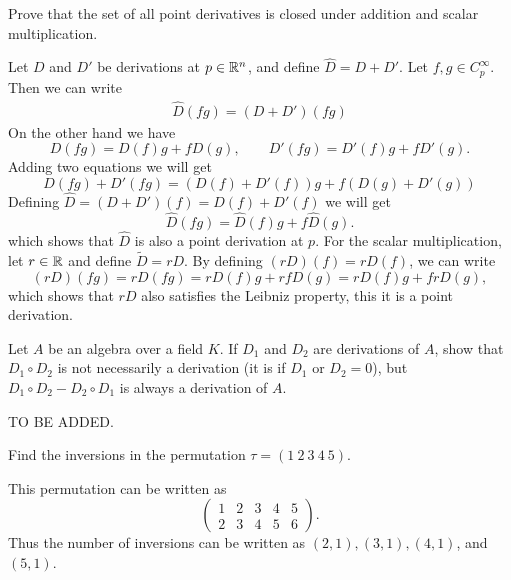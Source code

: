 \begin{problem}
	Prove that the set of all point derivatives is closed under addition and scalar multiplication.
\end{problem}
\begin{solution}
	Let $ D $ and $ D' $ be derivations at $ p\in\mathbb{R}^n $, and define $ \hat{D} = D + D' $. Let $ f,g \in C_p^\infty $. Then we can write
	\begin{align*}
		\hat{D} (fg) = (D + D')(fg)
	\end{align*}
	On the other hand we have
	\[ D(fg) = D(f)g + fD(g), \qquad D'(fg) = D'(f)g + fD'(g). \]
	Adding two equations we will get
	\[ D(fg) + D'(fg) = (D(f) + D'(f))g + f(D(g)+D'(g)) \]
	Defining $ \hat{D} = (D+D')(f) = D(f)+D'(f) $ we will get
	\[ \hat{D}(fg) = \hat{D}(f) g + f \hat{D}(g).  \]
	which shows that $ \hat{D} $ is also a point derivation at $ p $.
	For the scalar multiplication, let $ r \in \mathbb{R} $ and define $ \tilde{D} = rD $. By defining $ (rD)(f) = rD(f) $, we can write
	\[ (rD)(fg) = rD(fg) = rD(f)g + rfD(g) = rD(f)g + frD(g),  \]
	which shows that $ rD $ also satisfies the Leibniz property, this it is a point derivation.
\end{solution}

\begin{problem}
	Let $ A $ be an algebra over a field $ K $. If $ D_1 $ and $ D_2 $ are derivations of $ A $, show that $ D_1\circ D_2 $ is not necessarily a derivation (it is if $ D_1 $ or $ D_2 = 0 $), but $ D_1\circ D_2 - D_2 \circ D_1 $ is always a derivation of $ A $.	
\end{problem}
\begin{solution}
	{\color{orange} TO BE ADDED. }
\end{solution}



\begin{problem}
	Find the inversions in the permutation $ \tau = (1\ 2\ 3\ 4\ 5) $.
\end{problem}
\begin{solution}
	This permutation can be written as
	\[ \begin{pmatrix}
		1 & 2 & 3 & 4 & 5 \\
		2 & 3 & 4 & 5 & 6
	\end{pmatrix}. \]
	Thus the number of inversions can be written as $ (2,1),(3,1),(4,1)$, and $ (5,1) $.
\end{solution}
